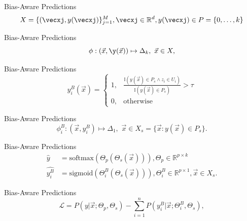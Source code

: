\documentclass{beamer}
\begin{document}
%
\begin{frame}{Bias-Aware Predictions}
%
\begin{equation}
X=\{(\vecxj, y(\vecxj)\}_{j=1}^{M}, \vecxj \in \mathbb{R}^d,
y(\vecxj) \in P=\{0,\ldots,k\}
\end{equation}
\end{frame}
%
\begin{frame}{Bias-Aware Predictions}
%
\begin{equation}
\phi: (\vec{x},\y(\vec{x})) \mapsto \Delta_{k},\,\, \vec{x} \in X \label{eq:primary-transformation},    
\end{equation}
\end{frame}
%
\begin{frame}{Bias-Aware Predictions}
%
\begin{equation}
y^B_i(\vec{x}) =
\begin{cases} 
1, & \frac{\mathbb{I}(y(\vec{x}) \in P_s \land z_i \in U_i)}{\mathbb{I}(y(\vec{x}) \in P_s)} > \tau\\
0, & \mathrm{otherwise}  \label{eq:yb-def}
\end{cases}
\end{equation}
\end{frame}
%
\begin{frame}{Bias-Aware Predictions}
%
\begin{equation}
\phi^B_i: (\vec{x}, y^B_i) \mapsto \Delta_{1},\,\, \vec{x} \in X_s = \{\vec{x}: y(\vec{x}) \in P_s\}.  \label{eq:biastaskmap}
\end{equation}
\end{frame}
%
\begin{frame}{Bias-Aware Predictions}
%
\begin{equation}
\begin{split}
\hat{y} & = \mathrm{softmax}(\Theta_p(\Theta_s(\vec{x}))), \Theta_p \in \mathbb{R}^{p \times k} \\
\hat{y^B_i} & = \mathrm{sigmoid}(\Theta^B_i(\Theta_s(\vec{x}))), \Theta^B_{i} \in \mathbb{R}^{p \times 1}, \vec{x} \in X_s \label{eq:softmax}.
\end{split}
\end{equation}
\end{frame}
%
\begin{frame}{Bias-Aware Predictions}
%
\begin{equation}
\mathcal{L}=P(y|\vec{x};\Theta_p,\Theta_s) - \sum_{i=1}^{n} P(y^B_i|\vec{x};\Theta^B_{i},\Theta_s), \label{eq:jointloss}
\end{equation}
\end{frame}
\end{document}
